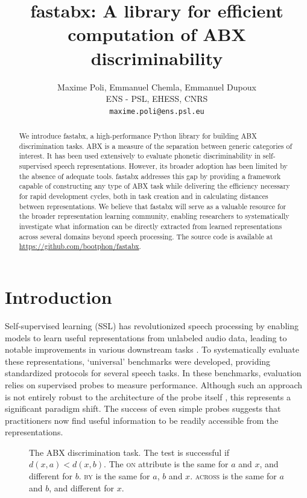 \documentclass[11pt]{article}
\title{fastabx: A library for efficient computation of ABX discriminability}
\author{
    Maxime Poli, Emmanuel Chemla, Emmanuel Dupoux \\
  ENS - PSL, EHESS, CNRS \\
  \texttt{maxime.poli@ens.psl.eu}
}
\newcommand{\on}{\textsc{on}\xspace}
\newcommand{\by}{\textsc{by}\xspace}
\newcommand{\across}{\textsc{across}\xspace}
\begin{document}
\maketitle

\begin{abstract}
We introduce fastabx, a high-performance Python library for building ABX discrimination tasks. ABX is a measure of the separation between generic categories of interest. It has been used extensively to evaluate phonetic discriminability in self-supervised speech representations. However, its broader adoption has been limited by the absence of adequate tools. fastabx addresses this gap by providing a framework capable of constructing any type of ABX task while delivering the efficiency necessary for rapid development cycles, both in task creation and in calculating distances between representations. We believe that fastabx will serve as a valuable resource for the broader representation learning community, enabling researchers to systematically investigate what information can be directly extracted from learned representations across several domains beyond speech processing. The source code is available at
\url{https://github.com/bootphon/fastabx}.
\end{abstract}

\section{Introduction}
Self-supervised learning (SSL) has revolutionized speech processing by enabling models to learn useful representations from unlabeled audio data, leading to notable improvements in various downstream tasks \citep{mohamed2022selfsupervised,baevski2020wav2vec,hsu2021hubert,yang2021superb}. To systematically evaluate these representations, `universal' benchmarks \citep{yang2021superb} were developed, providing standardized protocols for several speech tasks. In these benchmarks, evaluation relies on supervised probes to measure performance. Although such an approach is not entirely robust to the architecture of the probe itself \citep{ZAIEM2025101695}, this represents a significant paradigm shift. The success of even simple probes suggests that practitioners now find useful information to be readily accessible from the representations.

\begin{figure}[ht]
    \centering
    
    \setlength{\belowcaptionskip}{-10pt}
    \caption{The ABX discrimination task. The test is successful if $d(x, a) < d(x, b)$. The \on attribute is the same for $a$ and $x$, and different for $b$. \by is the same for $a$, $b$ and $x$. \across is the same for $a$ and $b$, and different for $x$.}
    \label{fig:abx}
\end{figure}
\end{document}
